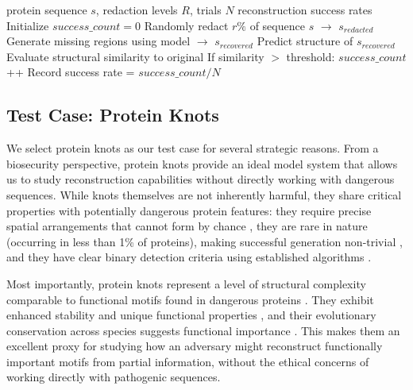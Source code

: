\documentclass{article}
\begin{document}
\begin{algorithm}[h]
   \caption{Redaction Robustness Evaluation}
   \label{alg:redaction_eval}
\begin{algorithmic}
    protein sequence $s$, redaction levels $R$, trials $N$
    reconstruction success rates
   \STATE Initialize $success\_count = 0$
   \STATE Randomly redact $r\%$ of sequence $s$ $\rightarrow$ $s_{redacted}$
   \STATE Generate missing regions using model $\rightarrow$ $s_{recovered}$
   \STATE Predict structure of $s_{recovered}$
   \STATE Evaluate structural similarity to original
   \STATE If similarity $>$ threshold: $success\_count$++
   \ENDFOR
   \STATE Record success rate = $success\_count / N$
   \ENDFOR
\end{algorithmic}
\end{algorithm}

\subsection{Test Case: Protein Knots}

We select protein knots as our test case for several strategic reasons. From a biosecurity perspective, protein knots provide an ideal model system that allows us to study reconstruction capabilities without directly working with dangerous sequences. While knots themselves are not inherently harmful, they share critical properties with potentially dangerous protein features: they require precise spatial arrangements that cannot form by chance \cite{virnau2006intricate}, they are rare in nature (occurring in less than 1\% of proteins), making successful generation non-trivial \cite{taylor2000protein,dabrowski2017topological}, and they have clear binary detection criteria using established algorithms \cite{lua2012pyknot,mishra2012knot}.

Most importantly, protein knots represent a level of structural complexity comparable to functional motifs found in dangerous proteins \cite{orengo1997cath}. They exhibit enhanced stability and unique functional properties \cite{strassler2022tied,king2007identification,soler2013effects}, and their evolutionary conservation across species suggests functional importance \cite{brems2022alphafold,begun2024effect,puri2022elucidation}. This makes them an excellent proxy for studying how an adversary might reconstruct functionally important motifs from partial information, without the ethical concerns of working directly with pathogenic sequences.
\end{document}

